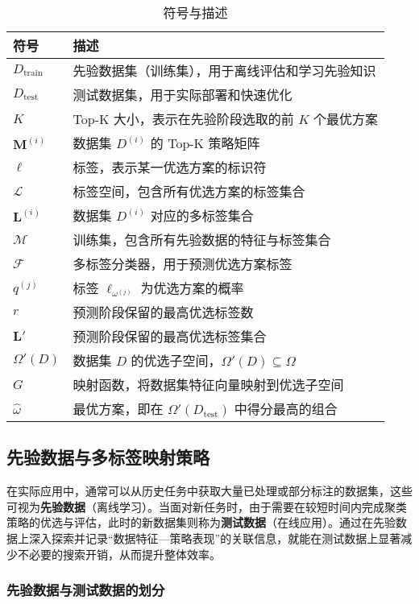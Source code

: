 \documentclass[10pt]{article} %
\numberwithin{equation}{section}
\begin{document}
\begin{table}[ht]
\centering
\small %
\renewcommand{\arraystretch}{1.1} %
\label{tab:symbols-advanced}
\begin{tabular}{ll}
\toprule
\textbf{符号} & \textbf{描述} \\
\midrule
$D_{\text{train}}$ & 先验数据集（训练集），用于离线评估和学习先验知识 \\
$D_{\text{test}}$ & 测试数据集，用于实际部署和快速优化 \\
$K$ & Top-K 大小，表示在先验阶段选取的前 $K$ 个最优方案 \\
$\mathbf{M}^{(i)}$ & 数据集 $D^{(i)}$ 的 Top-K 策略矩阵 \\
$\ell$ & 标签，表示某一优选方案的标识符 \\
$\mathcal{L}$ & 标签空间，包含所有优选方案的标签集合 \\
$\mathbf{L}^{(i)}$ & 数据集 $D^{(i)}$ 对应的多标签集合 \\
$\mathcal{M}$ & 训练集，包含所有先验数据的特征与标签集合 \\
$\mathcal{F}$ & 多标签分类器，用于预测优选方案标签 \\
$q^{(j)}$ & 标签 $\ell_{\omega^{(j)}}$ 为优选方案的概率 \\
$r$ & 预测阶段保留的最高优选标签数 \\
$\mathbf{L}'$ & 预测阶段保留的最高优选标签集合 \\
$\Omega'(D)$ & 数据集 $D$ 的优选子空间，$\Omega'(D) \subseteq \Omega$ \\
$G$ & 映射函数，将数据集特征向量映射到优选子空间 \\
$\hat{\omega}$ & 最优方案，即在 $\Omega'(D_{\text{test}})$ 中得分最高的组合 \\
\bottomrule
\end{tabular}
\caption{符号与描述}
\end{table}
\subsection{先验数据与多标签映射策略}
\label{sec:prior-data-mapping}


在实际应用中，通常可以从历史任务中获取大量已处理或部分标注的数据集，这些可视为\textbf{先验数据}（离线学习）。当面对新任务时，由于需要在较短时间内完成聚类策略的优选与评估，此时的新数据集则称为\textbf{测试数据}（在线应用）。通过在先验数据上深入探索并记录“数据特征—策略表现”的关联信息，就能在测试数据上显著减少不必要的搜索开销，从而提升整体效率。

\subsubsection{先验数据与测试数据的划分}
\label{subsec:dataset-split}
\end{document}
